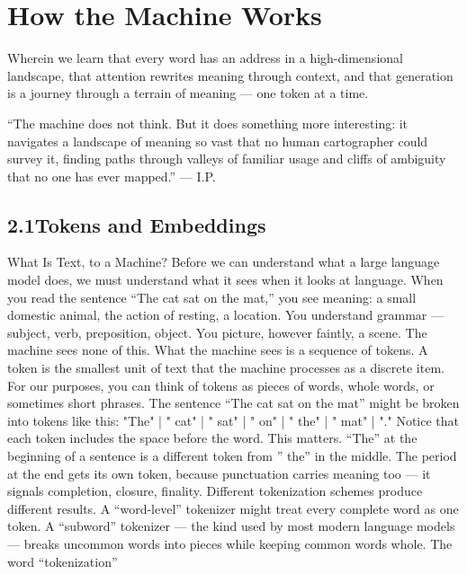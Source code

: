 \chapter{How the Machine Works}
\label{ch:02}

Wherein we learn that every word has an address in a high-dimensional landscape, that attention rewrites meaning through context, and that generation is a journey through a terrain of meaning — one token at a time.

“The machine does not think. But it does something more interesting: it navigates a landscape of meaning so vast that no human cartographer could survey it, finding paths through valleys of familiar usage and cliffs of ambiguity that no one has ever mapped.” — I.P.

\section{2.1\quad Tokens and Embeddings}

What Is Text, to a Machine? Before we can understand what a large language model does, we must understand what it sees when it looks at language. When you read the sentence “The cat sat on the mat,” you see meaning: a small domestic animal, the action of resting, a location. You understand grammar — subject, verb, preposition, object. You picture, however faintly, a scene. The machine sees none of this. What the machine sees is a sequence of tokens. A token is the smallest unit of text that the machine processes as a discrete item. For our purposes, you can think of tokens as pieces of words, whole words, or sometimes short phrases. The sentence “The cat sat on the mat” might be broken into tokens like this: "The" | " cat" | " sat" | " on" | " the" | " mat" | "." Notice that each token includes the space before the word. This matters. “The” at the beginning of a sentence is a different token from ” the” in the middle. The period at the end gets its own token, because punctuation carries meaning too — it signals completion, closure, finality. Different tokenization schemes produce different results. A “word-level” tokenizer might treat every complete word as one token. A “subword” tokenizer — the kind used by most modern language models — breaks uncommon words into pieces while keeping common words whole. The word “tokenization”

